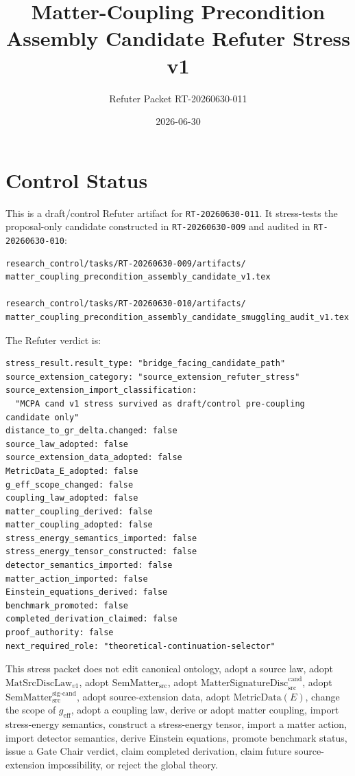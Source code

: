 \documentclass[11pt]{article}
\title{Matter-Coupling Precondition Assembly Candidate Refuter Stress v1}
\author{Refuter Packet RT-20260630-011}
\date{2026-06-30}
\newcommand{\MetricData}{\mathrm{MetricData}}
\newcommand{\geff}{g_{\mathrm{eff}}}
\newcommand{\MatSrcDiscLaw}{\mathrm{MatSrcDiscLaw}_{v1}}
\newcommand{\SemMatterSrc}{\mathrm{SemMatter}_{\mathrm{src}}}
\newcommand{\SemMatterSig}{\mathrm{SemMatter}_{\mathrm{src}}^{\mathrm{sig\text{-}cand}}}
\newcommand{\MatSigDisc}{\mathrm{MatterSignatureDisc}_{\mathrm{src}}^{\mathrm{cand}}}
\begin{document}
\maketitle

\section{Control Status}

This is a draft/control Refuter artifact for \texttt{RT-20260630-011}. It
stress-tests the proposal-only candidate constructed in \texttt{RT-20260630-009}
and audited in \texttt{RT-20260630-010}:

\begin{verbatim}
research_control/tasks/RT-20260630-009/artifacts/
matter_coupling_precondition_assembly_candidate_v1.tex

research_control/tasks/RT-20260630-010/artifacts/
matter_coupling_precondition_assembly_candidate_smuggling_audit_v1.tex
\end{verbatim}

The Refuter verdict is:

\begin{verbatim}
stress_result.result_type: "bridge_facing_candidate_path"
source_extension_category: "source_extension_refuter_stress"
source_extension_import_classification:
  "MCPA cand v1 stress survived as draft/control pre-coupling candidate only"
distance_to_gr_delta.changed: false
source_law_adopted: false
source_extension_data_adopted: false
MetricData_E_adopted: false
g_eff_scope_changed: false
coupling_law_adopted: false
matter_coupling_derived: false
matter_coupling_adopted: false
stress_energy_semantics_imported: false
stress_energy_tensor_constructed: false
detector_semantics_imported: false
matter_action_imported: false
Einstein_equations_derived: false
benchmark_promoted: false
completed_derivation_claimed: false
proof_authority: false
next_required_role: "theoretical-continuation-selector"
\end{verbatim}

This stress packet does not edit canonical ontology, adopt a source law, adopt
\(\MatSrcDiscLaw\), adopt \(\SemMatterSrc\), adopt \(\MatSigDisc\), adopt
\(\SemMatterSig\), adopt source-extension data, adopt \(\MetricData(E)\),
change the scope of \(\geff\), adopt a coupling law, derive or adopt matter
coupling, import stress-energy semantics, construct a stress-energy tensor,
import a matter action, import detector semantics, derive Einstein equations,
promote benchmark status, issue a Gate Chair verdict, claim completed
derivation, claim future source-extension impossibility, or reject the global
theory.
\end{document}
